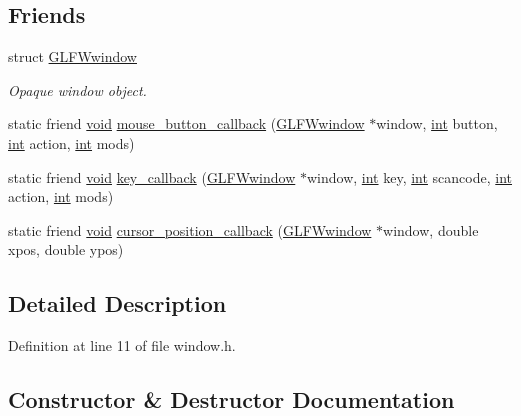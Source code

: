 \subsection*{Friends}
\begin{DoxyCompactItemize}
\item 
struct \hyperlink{classu__engine_1_1graphics_1_1_window_aae4160679a33d851ec8945cc866dfaac}{G\+L\+F\+Wwindow}
\begin{DoxyCompactList}\small\item\em Opaque window object. \end{DoxyCompactList}\item 
static friend \hyperlink{wglew_8h_aeea6e3dfae3acf232096f57d2d57f084}{void} \hyperlink{classu__engine_1_1graphics_1_1_window_a934c179d0911e7f70088cebec526bfb6}{mouse\+\_\+button\+\_\+callback} (\hyperlink{group__window_ga3c96d80d363e67d13a41b5d1821f3242}{G\+L\+F\+Wwindow} $\ast$window, \hyperlink{wglew_8h_a500a82aecba06f4550f6849b8099ca21}{int} button, \hyperlink{wglew_8h_a500a82aecba06f4550f6849b8099ca21}{int} action, \hyperlink{wglew_8h_a500a82aecba06f4550f6849b8099ca21}{int} mods)
\item 
static friend \hyperlink{wglew_8h_aeea6e3dfae3acf232096f57d2d57f084}{void} \hyperlink{classu__engine_1_1graphics_1_1_window_a5d0f196b2f1443f793ef20de522995a3}{key\+\_\+callback} (\hyperlink{group__window_ga3c96d80d363e67d13a41b5d1821f3242}{G\+L\+F\+Wwindow} $\ast$window, \hyperlink{wglew_8h_a500a82aecba06f4550f6849b8099ca21}{int} key, \hyperlink{wglew_8h_a500a82aecba06f4550f6849b8099ca21}{int} scancode, \hyperlink{wglew_8h_a500a82aecba06f4550f6849b8099ca21}{int} action, \hyperlink{wglew_8h_a500a82aecba06f4550f6849b8099ca21}{int} mods)
\item 
static friend \hyperlink{wglew_8h_aeea6e3dfae3acf232096f57d2d57f084}{void} \hyperlink{classu__engine_1_1graphics_1_1_window_abd0dee5e80d63ce619c6681efb034852}{cursor\+\_\+position\+\_\+callback} (\hyperlink{group__window_ga3c96d80d363e67d13a41b5d1821f3242}{G\+L\+F\+Wwindow} $\ast$window, double xpos, double ypos)
\end{DoxyCompactItemize}


\subsection{Detailed Description}


Definition at line 11 of file window.\+h.



\subsection{Constructor \& Destructor Documentation}
\hypertarget{classu__engine_1_1graphics_1_1_window_abffd9ce4556a8020292f0db6e86c4b7b}{}
